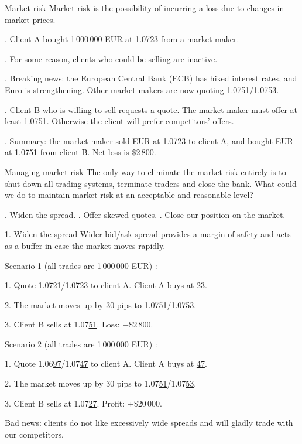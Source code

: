 \documentclass{beamer}
\begin{document}
\begin{frame}{Market risk}
\justify
\alert{Market risk} is the possibility of incurring a loss due to changes in market prices.

. Client A bought 1\,000\,000 EUR at 1.07\underline{23} from a market-maker.

. For some reason, clients who could be selling are inactive.

. Breaking news: the European Central Bank (ECB) has hiked interest rates, and Euro is strengthening. Other market-makers are now quoting 1.07\underline{51}/1.07\underline{53}.

. Client B who is willing to sell requests a quote. The market-maker must offer at least 1.07\underline{51}. Otherwise the client will prefer competitors' offers.

. Summary: the market-maker sold EUR at 1.07\underline{23} to client A, and bought EUR at 1.07\underline{51} from client B. Net loss is \$2\,800.
\end{frame}



\begin{frame}{Managing market risk}
\justify
The only way to eliminate the market risk entirely is to shut down all trading systems, terminate traders and close the bank. What could we do to maintain market risk at an acceptable and reasonable level?

. Widen the spread.
. Offer skewed quotes.
. Close our position on the market.
\end{frame}



\begin{frame}{1. Widen the spread}
\justify
Wider bid/ask spread provides a margin of safety and acts as a buffer in case the market moves
rapidly.

\justify
Scenario 1 (all trades are 1\,000\,000 EUR) :

1. Quote 1.07\underline{21}/1.07\underline{23} to client A. Client A buys at \underline{23}.

2. The market moves up by 30 pips to 1.07\underline{51}/1.07\underline{53}.

3. Client B sells at 1.07\underline{51}. Loss: $-\$2\,800$.

\justify
Scenario 2 (all trades are 1\,000\,000 EUR) :

1. Quote 1.06\underline{97}/1.07\underline{47} to client A. Client A buys at \underline{47}.

2. The market moves up by 30 pips to 1.07\underline{51}/1.07\underline{53}.

3. Client B sells at 1.07\underline{27}. Profit: $+\$20\,000$.

\justify
Bad news: clients do not like excessively wide spreads and will gladly trade with our competitors.
\end{frame}
\end{document}
